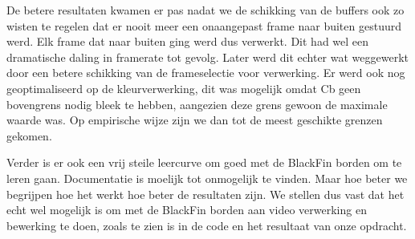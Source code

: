\par De betere resultaten kwamen er pas nadat we de schikking van de buffers ook zo wisten te regelen dat er nooit meer een onaangepast frame naar buiten gestuurd werd. Elk frame dat naar buiten ging werd dus verwerkt. Dit had wel een dramatische daling in framerate tot gevolg. Later werd dit echter wat weggewerkt door een betere schikking van de frameselectie voor verwerking. Er werd ook nog geoptimaliseerd op de kleurverwerking, dit was mogelijk omdat Cb geen bovengrens nodig bleek te hebben, aangezien deze grens gewoon de maximale waarde was. Op empirische wijze zijn we dan tot de meest geschikte grenzen gekomen.

\par Verder is er ook een vrij steile leercurve om goed met de BlackFin borden om te leren gaan. Documentatie is moelijk tot onmogelijk te vinden. Maar hoe beter we begrijpen hoe het werkt hoe beter de resultaten zijn. We stellen dus vast dat het echt wel mogelijk is om met de BlackFin borden aan video verwerking en bewerking te doen, zoals te zien is in de code en het resultaat van onze opdracht.